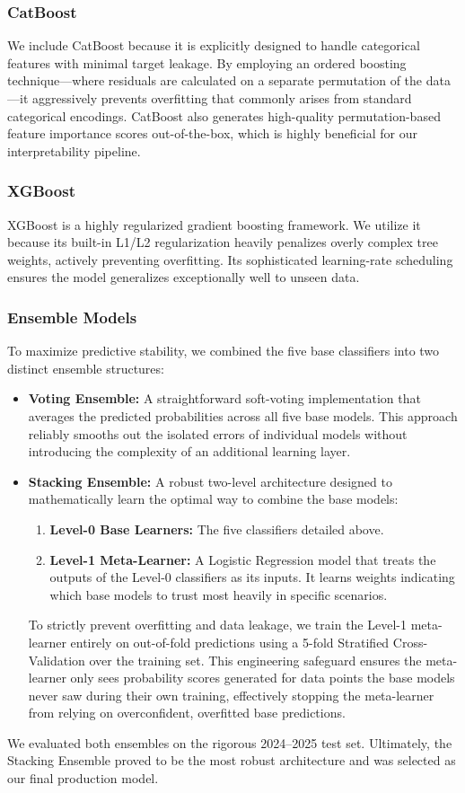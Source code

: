 \subsubsection{CatBoost}

We include CatBoost because it is explicitly designed to handle categorical features with minimal target leakage. By employing an ordered boosting technique---where residuals are calculated on a separate permutation of the data---it aggressively prevents overfitting that commonly arises from standard categorical encodings. CatBoost also generates high-quality permutation-based feature importance scores out-of-the-box, which is highly beneficial for our interpretability pipeline.

\subsubsection{XGBoost}

XGBoost is a highly regularized gradient boosting framework. We utilize it because its built-in L1/L2 regularization heavily penalizes overly complex tree weights, actively preventing overfitting. Its sophisticated learning-rate scheduling ensures the model generalizes exceptionally well to unseen data.

\subsubsection{Ensemble Models}

To maximize predictive stability, we combined the five base classifiers into two distinct ensemble structures:

\begin{itemize}
    \item \textbf{Voting Ensemble:} A straightforward soft-voting implementation that averages the predicted probabilities across all five base models. This approach reliably smooths out the isolated errors of individual models without introducing the complexity of an additional learning layer.
    \item \textbf{Stacking Ensemble:} A robust two-level architecture designed to mathematically learn the optimal way to combine the base models:
    \begin{enumerate}
        \item \textbf{Level-0 Base Learners:} The five classifiers detailed above.
        \item \textbf{Level-1 Meta-Learner:} A Logistic Regression model that treats the outputs of the Level-0 classifiers as its inputs. It learns weights indicating which base models to trust most heavily in specific scenarios.
    \end{enumerate}
    To strictly prevent overfitting and data leakage, we train the Level-1 meta-learner entirely on out-of-fold predictions using a 5-fold Stratified Cross-Validation over the training set. This engineering safeguard ensures the meta-learner only sees probability scores generated for data points the base models never saw during their own training, effectively stopping the meta-learner from relying on overconfident, overfitted base predictions.
\end{itemize}

We evaluated both ensembles on the rigorous 2024--2025 test set. Ultimately, the Stacking Ensemble proved to be the most robust architecture and was selected as our final production model.
